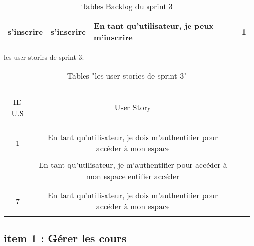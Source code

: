 \begin{table}[]
\begin{tabular}{|l|l|l|l|}
		\textbf{s'inscrire}                    & s'inscrire                                                            & En tant qu'utilisateur, je peux m'inscrire                                                                        & 1    \\ \hline
	\end{tabular}
	
	
	\caption{Tables Backlog du sprint 3}
	\label{Tables Backlog du sprint 3}
\end{table}










\begin{table}[h]
	{\Large\color{cyan} les user stories de sprint 3:}\\
	
	\begin{center}
		\begin{tabular}{>{\begin{bf} } c <{\end{bf}}ccc}
			
			\rowcolor{-blue!20!red}ID U.S & \begin{bf}User Story \end{bf}  & \\
			
			1 & En tant qu’utilisateur, je dois m’authentifier pour accéder à mon espace \\
			& En tant qu’utilisateur, je  m’authentifier pour accéder à mon espace entifier accéder
			\\
			& \\
			7 & En tant qu’utilisateur, je dois m’authentifier pour accéder à mon espace \\
			
			
		\end{tabular}
	\end{center}
	\caption{Tables  "les user stories de sprint 3"}
	\label{les user stories de sprint 3}
\end{table}


\clearpage

\clearpage

\subsection{item 1 : Gérer les cours}

